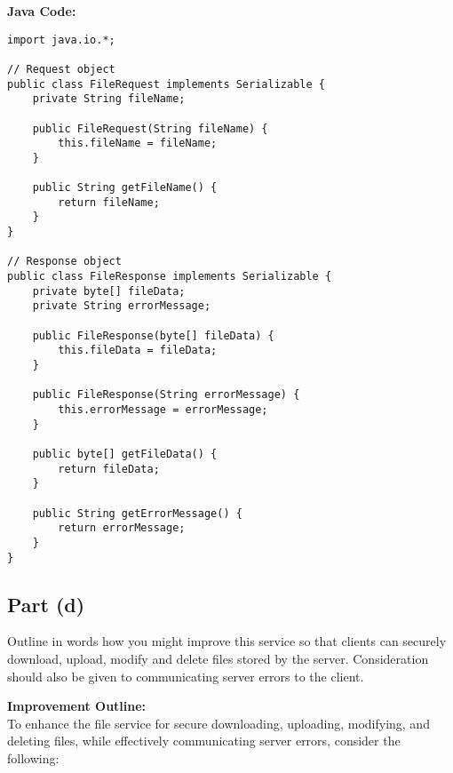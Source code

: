 \documentclass[12pt]{article}
\begin{document}
\vspace{0.1in} %

\textbf{Java Code:}

\begin{lstlisting}
import java.io.*;

// Request object
public class FileRequest implements Serializable {
    private String fileName;

    public FileRequest(String fileName) {
        this.fileName = fileName;
    }

    public String getFileName() {
        return fileName;
    }
}

// Response object
public class FileResponse implements Serializable {
    private byte[] fileData;
    private String errorMessage;

    public FileResponse(byte[] fileData) {
        this.fileData = fileData;
    }

    public FileResponse(String errorMessage) {
        this.errorMessage = errorMessage;
    }

    public byte[] getFileData() {
        return fileData;
    }

    public String getErrorMessage() {
        return errorMessage;
    }
}
\end{lstlisting}

\subsection*{Part (d)} Outline in words how you might improve this service so that clients can securely
download, upload, modify and delete files stored by the server. Consideration
should also be given to communicating server errors to the client. 

\vspace{0.1in} %

\textbf{Improvement Outline:} \\
To enhance the file service for secure downloading, uploading, modifying, and deleting files, while effectively communicating server errors, consider the following:
\end{document}
